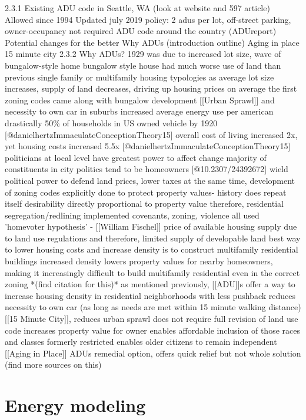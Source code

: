 2.3.1 Existing ADU code in Seattle, WA (look at website and 597 article)
Allowed since 1994
Updated july 2019 policy: 2 adus per lot, off-street parking, owner-occupancy not required
ADU code around the country (ADUreport)
Potential changes for the better
Why ADUs (introduction outline)
Aging in place
15 minute city
	2.3.2 Why ADUs?
1929 was due to increased lot size, wave of bungalow-style home
bungalow style house had much worse use of land than previous single family or multifamily housing typologies
as average lot size increases, supply of land decreases, driving up housing prices on average
the first zoning codes came along with bungalow development
[[Urban Sprawl]] and necessity to own car in suburbs increased average energy use per american drastically
50\% of households in US owned vehicle by 1920 [@danielhertzImmaculateConceptionTheory15]
overall cost of living increased 2x, yet housing costs increased 5.5x [@danielhertzImmaculateConceptionTheory15]
politicians at local level have greatest power to affect change
majority of constituents in city politics tend to be homeowners [@10.2307/24392672]
wield political power to defend land prices, lower taxes
at the same time, development of zoning codes explicitly done to protect property values- history does repeat itself
desirability directly proportional to property value
therefore, residential segregation/redlining implemented
covenants, zoning, violence all used
'homevoter hypothesis' - [[William Fischel]]
price of available housing supply due to land use regulations and therefore, limited supply of developable land
best way to lower housing costs and increase density is to construct multifamily residential buildings
increased density lowers property values for nearby homeowners, making it increasingly difficult to build multifamily residential even in the correct zoning *(find citation for this)*
as mentioned previously, [[ADU]]s offer a way to increase housing density in residential neighborhoods with less pushback
reduces necessity to own car (as long as needs are met within 15 minute walking distance) [[15 Minute City]], reduces urban sprawl
does not require full revision of land use code
increases property value for owner
enables affordable inclusion of those races and classes formerly restricted
enables older citizens to remain independent
[[Aging in Place]]
ADUs remedial option, offers quick relief but not whole solution (find more sources on this)

 
\section{Energy modeling}

